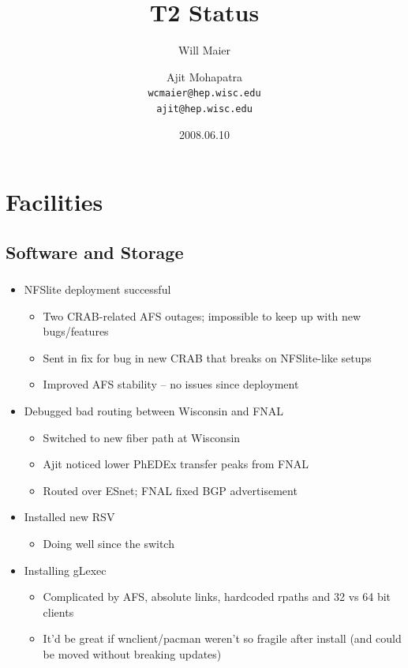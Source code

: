 \documentclass{beamer}
\title{T2 Status}
\author[Maier, Mohapatra]{
    Will Maier \and Ajit Mohapatra\\ 
    {\tt wcmaier@hep.wisc.edu}\\
    {\tt ajit@hep.wisc.edu}}
\institute[Wisconsin]{University of Wisconsin - High Energy Physics}
\date{2008.06.10}
\begin{document}
\begin{frame}
    \titlepage
\end{frame}


\section{Facilities}
\subsection{Software and Storage}
\begin{frame}
\frametitle{}
\begin{itemize}
    \item NFSlite deployment successful
    \begin{itemize}
        \item Two CRAB-related AFS outages; impossible to keep up with new bugs/features
        \item Sent in fix for bug in new CRAB that breaks on NFSlite-like setups
        \item Improved AFS stability -- no issues since deployment
    \end{itemize}
    \item Debugged bad routing between Wisconsin and FNAL
    \begin{itemize}
        \item Switched to new fiber path at Wisconsin
        \item Ajit noticed lower PhEDEx transfer peaks from FNAL
        \item Routed over ESnet; FNAL fixed BGP advertisement
    \end{itemize}
    \item Installed new RSV
    \begin{itemize}
        \item Doing well since the switch
    \end{itemize}
    \item Installing gLexec
    \begin{itemize}
        \item Complicated by AFS, absolute links, hardcoded rpaths and 32 vs 64 bit clients
        \item It'd be great if wnclient/pacman weren't so fragile after install (and could be moved without breaking updates)
    \end{itemize}
\end{itemize}
\end{frame}
\end{document}
